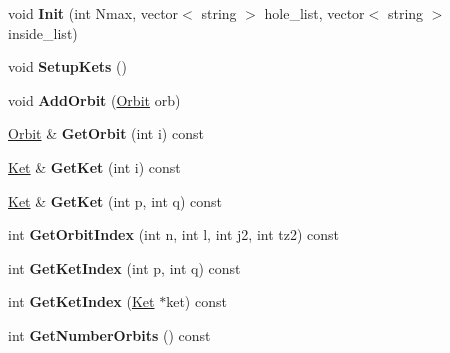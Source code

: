 \begin{DoxyCompactItemize}
\item 
\hypertarget{classModelSpace_a723f9a5ffb93d5d918ad46500d6136df}{void {\bfseries Init} (int Nmax, vector$<$ string $>$ hole\-\_\-list, vector$<$ string $>$ inside\-\_\-list)}\label{classModelSpace_a723f9a5ffb93d5d918ad46500d6136df}

\item 
\hypertarget{classModelSpace_ae1a3578ed5aabec2956998a870a4e2d2}{void {\bfseries Setup\-Kets} ()}\label{classModelSpace_ae1a3578ed5aabec2956998a870a4e2d2}

\item 
\hypertarget{classModelSpace_ad8acc2ca5b475862101595d911987a7e}{void {\bfseries Add\-Orbit} (\hyperlink{classOrbit}{Orbit} orb)}\label{classModelSpace_ad8acc2ca5b475862101595d911987a7e}

\item 
\hypertarget{classModelSpace_afe51ff3553478b349eba65c61a19ca3e}{\hyperlink{classOrbit}{Orbit} \& {\bfseries Get\-Orbit} (int i) const }\label{classModelSpace_afe51ff3553478b349eba65c61a19ca3e}

\item 
\hypertarget{classModelSpace_adc36e64fb3bb4dc76819f91e9057844f}{\hyperlink{classKet}{Ket} \& {\bfseries Get\-Ket} (int i) const }\label{classModelSpace_adc36e64fb3bb4dc76819f91e9057844f}

\item 
\hypertarget{classModelSpace_ab3662f5e12ce6da0164c8adbe1abbb95}{\hyperlink{classKet}{Ket} \& {\bfseries Get\-Ket} (int p, int q) const }\label{classModelSpace_ab3662f5e12ce6da0164c8adbe1abbb95}

\item 
\hypertarget{classModelSpace_ab3d8cb8214e082773caa5820773ee16e}{int {\bfseries Get\-Orbit\-Index} (int n, int l, int j2, int tz2) const }\label{classModelSpace_ab3d8cb8214e082773caa5820773ee16e}

\item 
\hypertarget{classModelSpace_ad2622b2d268c55b89a2082189f7185b1}{int {\bfseries Get\-Ket\-Index} (int p, int q) const }\label{classModelSpace_ad2622b2d268c55b89a2082189f7185b1}

\item 
\hypertarget{classModelSpace_ae87e8738f2aed2f23eab933b77a3772f}{int {\bfseries Get\-Ket\-Index} (\hyperlink{classKet}{Ket} $\ast$ket) const }\label{classModelSpace_ae87e8738f2aed2f23eab933b77a3772f}

\item 
\hypertarget{classModelSpace_a48004a4a3d559081827da87c9c4bfe94}{int {\bfseries Get\-Number\-Orbits} () const }\label{classModelSpace_a48004a4a3d559081827da87c9c4bfe94}


\end{DoxyCompactItemize}
